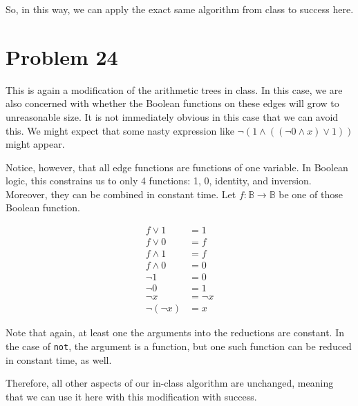 \documentclass{article}
\providecommand{\prob}[1]{\section*{Problem #1}}
\begin{document}
So, in this way, we can apply the exact same algorithm from class to success here.

\prob{24}
This is again a modification of the arithmetic trees in class.
In this case, we are also concerned with whether the Boolean functions on these edges will grow to unreasonable size.
It is not immediately obvious in this case that we can avoid this.
We might expect that some nasty expression like $\lnot(1 \land ((\lnot 0 \land x ) \lor 1))$ might appear.

Notice, however, that all edge functions are functions of one variable.
In Boolean logic, this constrains us to only 4 functions: 1, 0, identity, and inversion.
Moreover, they can be combined in constant time.
Let $f: \mathbb{B} \to \mathbb{B}$ be one of those Boolean function.

\begin{align*}
    f \lor 1 &= 1\\
    f \lor 0 &= f\\
    f \land 1 &= f\\
    f \land 0 &= 0\\
    \lnot 1 &= 0\\
    \lnot 0 &= 1\\
    \lnot x &= \lnot x\\
    \lnot (\lnot x) &= x
\end{align*}

Note that again, at least one the arguments into the reductions are constant.
In the case of \verb|not|, the argument is a function, but one such function can be reduced in constant time, as well.

Therefore, all other aspects of our in-class algorithm are unchanged, meaning that we can use it here with this modification with success.
\end{document}

